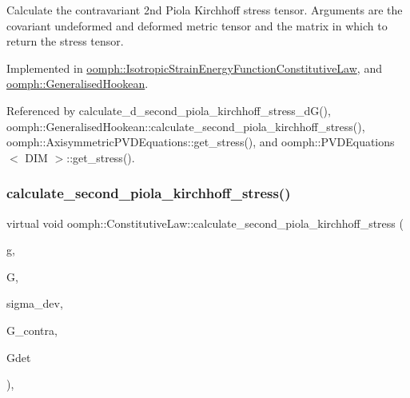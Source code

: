 Calculate the contravariant 2nd Piola Kirchhoff stress tensor. Arguments are the covariant undeformed and deformed metric tensor and the matrix in which to return the stress tensor. 



Implemented in \hyperlink{classoomph_1_1IsotropicStrainEnergyFunctionConstitutiveLaw_af6c25617b8be6cc454d6b526ec6121fc}{oomph\+::\+Isotropic\+Strain\+Energy\+Function\+Constitutive\+Law}, and \hyperlink{classoomph_1_1GeneralisedHookean_a5beca3e59f04d109c394bf9fd24bb7c1}{oomph\+::\+Generalised\+Hookean}.



Referenced by calculate\+\_\+d\+\_\+second\+\_\+piola\+\_\+kirchhoff\+\_\+stress\+\_\+d\+G(), oomph\+::\+Generalised\+Hookean\+::calculate\+\_\+second\+\_\+piola\+\_\+kirchhoff\+\_\+stress(), oomph\+::\+Axisymmetric\+P\+V\+D\+Equations\+::get\+\_\+stress(), and oomph\+::\+P\+V\+D\+Equations$<$ D\+I\+M $>$\+::get\+\_\+stress().

\mbox{\label{classoomph_1_1ConstitutiveLaw_ac8178b1b7cd7e6a64942dba9e0997b30}} 
\subsubsection{\texorpdfstring{calculate\+\_\+second\+\_\+piola\+\_\+kirchhoff\+\_\+stress()}{calculate\_second\_piola\_kirchhoff\_stress()}\hspace{0.1cm}{\footnotesize\ttfamily [2/3]}}
{\footnotesize\ttfamily virtual void oomph\+::\+Constitutive\+Law\+::calculate\+\_\+second\+\_\+piola\+\_\+kirchhoff\+\_\+stress (\begin{DoxyParamCaption}\item[{const \hyperlink{classoomph_1_1DenseMatrix}{Dense\+Matrix}$<$ double $>$ \&}]{g,  }\item[{const \hyperlink{classoomph_1_1DenseMatrix}{Dense\+Matrix}$<$ double $>$ \&}]{G,  }\item[{\hyperlink{classoomph_1_1DenseMatrix}{Dense\+Matrix}$<$ double $>$ \&}]{sigma\+\_\+dev,  }\item[{\hyperlink{classoomph_1_1DenseMatrix}{Dense\+Matrix}$<$ double $>$ \&}]{G\+\_\+contra,  }\item[{double \&}]{Gdet }\end{DoxyParamCaption})\hspace{0.3cm}{\ttfamily [inline]}, {\ttfamily [virtual]}}



